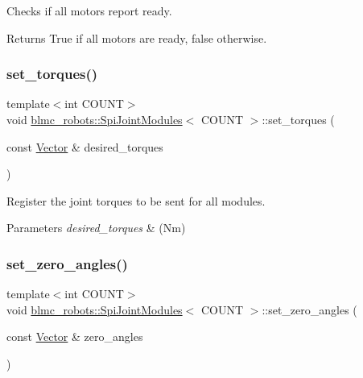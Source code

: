 Checks if all motors report ready. 

\begin{DoxyReturn}{Returns}
True if all motors are ready, false otherwise. 
\end{DoxyReturn}
\mbox{\label{classblmc__robots_1_1SpiJointModules_ad4abbcc6c228d823c06827093606983a}} 
\subsubsection{\texorpdfstring{set\+\_\+torques()}{set\_torques()}}
{\footnotesize\ttfamily template$<$int C\+O\+U\+NT$>$ \\
void \hyperlink{classblmc__robots_1_1SpiJointModules}{blmc\+\_\+robots\+::\+Spi\+Joint\+Modules}$<$ C\+O\+U\+NT $>$\+::set\+\_\+torques (\begin{DoxyParamCaption}\item[{const \hyperlink{classblmc__robots_1_1SpiJointModules_a2d48f81ec41a42a240e80cd22d4fa2f8}{Vector} \&}]{desired\+\_\+torques }\end{DoxyParamCaption})\hspace{0.3cm}{\ttfamily [inline]}}



Register the joint torques to be sent for all modules. 


\begin{DoxyParams}{Parameters}
{\em desired\+\_\+torques} & (Nm) \\
\hline
\end{DoxyParams}
\mbox{\label{classblmc__robots_1_1SpiJointModules_a9b6c71b98d4738e1167daf1baa443400}} 
\subsubsection{\texorpdfstring{set\+\_\+zero\+\_\+angles()}{set\_zero\_angles()}}
{\footnotesize\ttfamily template$<$int C\+O\+U\+NT$>$ \\
void \hyperlink{classblmc__robots_1_1SpiJointModules}{blmc\+\_\+robots\+::\+Spi\+Joint\+Modules}$<$ C\+O\+U\+NT $>$\+::set\+\_\+zero\+\_\+angles (\begin{DoxyParamCaption}\item[{const \hyperlink{classblmc__robots_1_1SpiJointModules_a2d48f81ec41a42a240e80cd22d4fa2f8}{Vector} \&}]{zero\+\_\+angles }\end{DoxyParamCaption})\hspace{0.3cm}{\ttfamily [inline]}}



